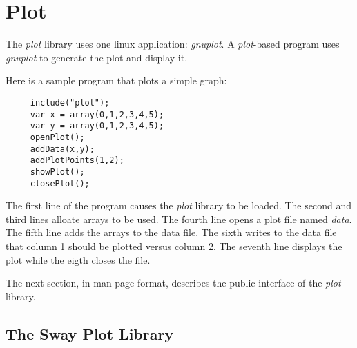 \section{Plot}

The {\it plot} library uses one linux application:
{\it gnuplot}. A {\it plot}-based program uses {\it gnuplot}
to generate the plot and display it.

Here is a sample program that plots a simple graph:
\color{CodeGreen}
\begin{codesize}
\begin{verbatim}
     include("plot");
     var x = array(0,1,2,3,4,5);
     var y = array(0,1,2,3,4,5);
     openPlot();
     addData(x,y);
     addPlotPoints(1,2);
     showPlot();
     closePlot();     
\end{verbatim}
\end{codesize}
\color{black}

The first line of the  program causes the {\it plot} library to be 
loaded. The second and third lines alloate arrays to be used. The fourth 
line opens a plot file named {\it data}. The fifth line adds the arrays 
to the data file. The sixth writes to the data file that column 1 should 
be plotted versus column 2. The seventh line displays the plot while the 
eigth closes the file.

The next section, in man page format, describes the public interface of 
the {\it plot} library.

\subsection*{The Sway Plot Library}

